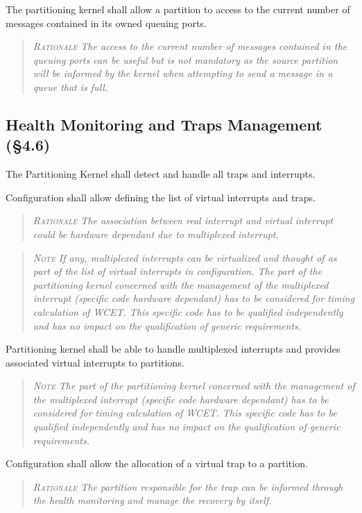 The partitioning kernel shall allow a partition to access to the current number of messages contained in its owned queuing ports.
\begin{quote}\it
\textsc{Rationale}
The access to the current number of messages contained in the queuing ports can be useful but is not mandatory as the source partition will be informed by the kernel when attempting to send a message in a queue that is full.
\end{quote}

\subsection{Health Monitoring and Traps Management (\S4.6)}

The Partitioning Kernel shall detect and handle all traps and interrupts.

Configuration shall allow defining the list of virtual interrupts and traps.
\begin{quote}\it
\textsc{Rationale}
The association between real interrupt and virtual interrupt could be hardware dependant due to multiplexed interrupt.
\end{quote}
\begin{quote}\it
\textsc{Note}
If any, multiplexed interrupts can be virtualized and thought of as part of the list of virtual interrupts in configuration. The part of the partitioning kernel concerned with the management of the multiplexed interrupt (specific code hardware dependant) has to be considered for timing calculation of WCET. This specific code has to be qualified independently and has no impact on the qualification of generic requirements.
\end{quote}

Partitioning kernel shall be able to handle multiplexed interrupts and provides associated virtual interrupts to partitions.
\begin{quote}\it
\textsc{Note}
The part of the partitioning kernel concerned with the management of the multiplexed interrupt (specific code hardware dependant) has to be considered for timing calculation of WCET. This specific code has to be qualified independently and has no impact on the qualification of generic requirements.
\end{quote}

Configuration shall allow the allocation of a virtual trap to a partition.
\begin{quote}\it
\textsc{Rationale}
The partition responsible for the trap can be informed through the health monitoring and manage the recovery by itself.
\end{quote}

